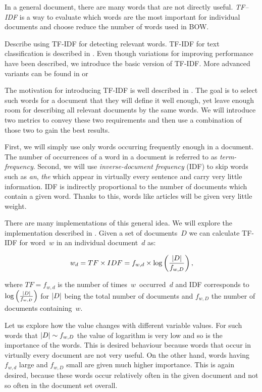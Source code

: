 In a general document, there are many words that are not directly useful.
{\it TF--IDF} is a way to evaluate which words are the most important for individual documents and
choose reduce the number of words used in BOW.

\citet{ramos2003using} Describe using TF-IDF for detecting relevant words.
TF-IDF for text classification is described in \citet{trstenjak2014knn}.
Even though variations for improving performance have been described,
we introduce the basic version of TF-IDF.
More advanced variants can be found in \citet{berger2000bridging} or
\citet{yun2005improved}

The motivation for introducing TF-IDF is well described in \citet{SalBuc88}.
The goal is to select such words for a document
that they will define it well enough, yet leave enough room for describing all relevant documents by the same words.
We will introduce two metrics to convey these two requirements and then use a combination of those two to gain the best results.

First, we will simply use only words occurring frequently enough in a document.
The number of occurrences of a word in a document is referred to as {\it term-frequency}.
Second, we will use {\it inverse-document frequency} (IDF) to skip words such as {\it an}, {\it the} which appear in virtually every sentence and carry very little information.
IDF is indirectly proportional to the number of documents which contain a given word.
Thanks to this, words like articles will be given very little weight.

There are many implementations of this general idea.
We will explore the implementation described in \citet{Ramos03}.
Given a set of documents~$D$
we can calculate TF-IDF for word~$w$ in an individual document~$d$ as:

\[
	w_d = TF \times IDF = f_{w, d} \times \log \left( \frac{\left|{D}\right|}{f_{w,D}}  \right),
\]

where $TF = f_{w, d}$ is the number of times~$w$~occurred~$d$ and
IDF corresponds to $\log \left( \frac{\left|{D}\right|}{f_{w,D}}  \right)$ for $\left|{D}\right|$ being the total number of documents and $f_{w, D}$ the number of documents containing~$w$.

Let us explore how the value changes with different variable values.
For such words that $\left|{D}\right| \sim f_{w, D}$ the value of logarithm is very low and so is the importance of the words.
This is desired behaviour because words that occur in virtually every document  are not very useful.
On the other hand, words having $f_{w,d}$ large and $f_{w,D}$ small are given much higher importance.
This is again desired, because these words occur relatively often in the given document and not so often in the document set overall.



